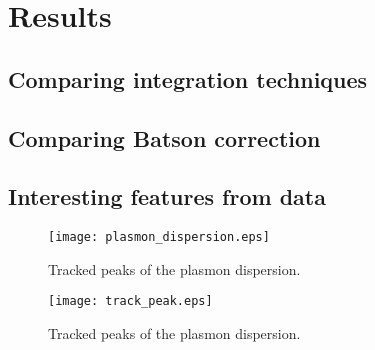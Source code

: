 \section{Results}
\subsection{Comparing integration techniques}
\subsection{Comparing Batson correction}
\subsection{Interesting features from data}

\begin{figure}
	\centering
	\texttt{[image: plasmon\_dispersion.eps]}
	\label{fig:plas_disp}
	\caption{Tracked peaks of the plasmon dispersion.}
\end{figure}

\begin{figure}
	\centering
	\texttt{[image: track\_peak.eps]}
	\label{fig:track_peak}
	\caption{Tracked peaks of the plasmon dispersion.}
\end{figure}